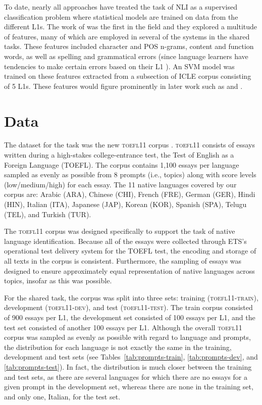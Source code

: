 \documentclass[11pt,letterpaper]{article}
\begin{document}
To date, nearly all approaches have treated the task of NLI as a 
supervised classification problem where statistical models are trained on 
data from the different L1s.  The work of 
was the first in the field and they explored a multitude of features, many
of which are employed in several of the systems in the shared tasks.  These
features included character and POS n-grams, content and function words,
as well as spelling and grammatical errors (since language learners have
tendencies to make certain errors based on their L1 \cite{SwanSmith01}).
An SVM model was trained on these features extracted from a subsection of 
ICLE corpus consisting of 5 L1s.  These features would figure prominently
in later work such as \cite{wong-dras:2011:EMNLP} and \cite{tetreault-EtAl:2012:PAPERS}.



\section{Data}
\label{sec-data}
The dataset for the task was the new \textsc{toefl11} corpus
\cite{blanchard-tetreault-higgins-cahill-chodorow:2013:TOEFL11-RR}. \textsc{toefl11}
consists of essays written during a high-stakes college-entrance test, the Test
of English as a Foreign Language (TOEFL\textsuperscript{\textregistered}). The
corpus contains 1,100 essays per language sampled as evenly as possible from 8
prompts (i.e., topics) along with score levels (low/medium/high) for each essay.
The 11 native languages covered by our corpus are: Arabic (ARA), Chinese
(CHI), French (FRE), German (GER), Hindi (HIN), Italian (ITA), Japanese
(JAP), Korean (KOR), Spanish (SPA), Telugu (TEL), and Turkish (TUR).

The \textsc{toefl11} corpus was designed specifically to support the task of native
language identification.  Because all of the essays were collected through ETS's
operational test delivery system for the TOEFL\textsuperscript{\textregistered}
test, the encoding and storage of all texts in the corpus is consistent.
Furthermore, the sampling of essays was designed to ensure approximately equal
representation of native languages across topics, insofar as this was possible.

For the shared task, the corpus was split into three sets: training (\textsc{toefl11-train}),
development (\textsc{toefl11-dev}), and test (\textsc{toefl11-test}). The train corpus consisted
of 900 essays per L1, the development set consisted of 100 essays per L1,
and the test set consisted of another 100 essays per L1.
Although the overall \textsc{toefl11} corpus was sampled as evenly
as possible with regard to language and prompts, the distribution for each
language is not exactly the same in the training, development and test sets (see
Tables~\ref{tab:prompts-train}, \ref{tab:prompts-dev}, and
\ref{tab:prompts-test}). In fact, the distribution is much closer between the
training and test sets, as there are several languages for which there are no
essays for a given prompt in the development set, whereas there are none in the
training set, and only one, Italian, for the test set.
\end{document}
